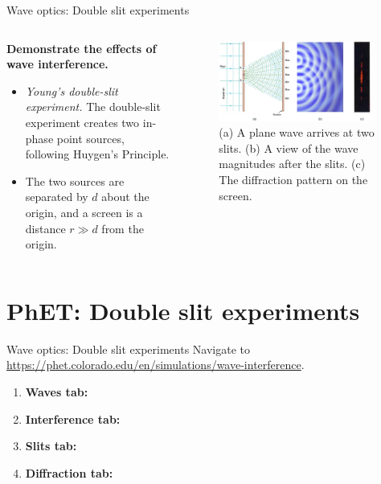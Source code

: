 \documentclass{beamer}
\begin{document}
\begin{frame}{Wave optics: Double slit experiments}
\begin{columns}[T]
\begin{column}{0.35\textwidth}
\footnotesize
\textbf{Demonstrate the effects of wave interference.}
\begin{itemize}
\item \textit{Young's double-slit experiment.}  The double-slit experiment creates two in-phase point sources, following Huygen's Principle.
\item The two sources are separated by $d$ about the origin, and a screen is a distance $r \gg d$ from the origin.
\end{itemize}
\end{column}
\begin{column}{0.65\textwidth}
\begin{figure}
\centering
\includegraphics[width=0.95\textwidth]{figures/slit3.png}
\caption{\label{fig:slit3} \footnotesize (a) A plane wave arrives at two slits. (b) A view of the wave magnitudes after the slits.  (c) The diffraction pattern on the screen.}
\end{figure}
\end{column}
\end{columns}
\end{frame}

\section{PhET: Double slit experiments}

\begin{frame}{Wave optics: Double slit experiments}
\small
Navigate to \url{https://phet.colorado.edu/en/simulations/wave-interference}.
\begin{enumerate}
\item \textbf{Waves tab:}
\item \textbf{Interference tab:}
\item \textbf{Slits tab:}
\item \textbf{Diffraction tab:}
\end{enumerate}
\end{frame}
\end{document}
